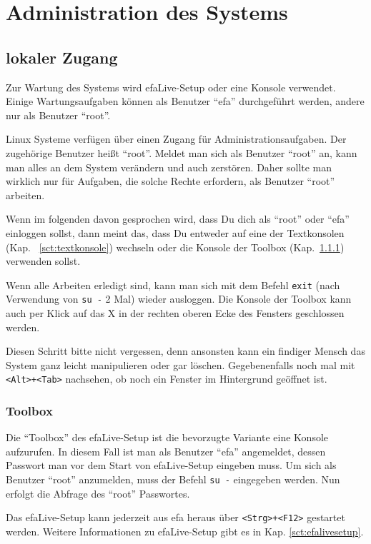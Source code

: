 \documentclass[a4paper,12pt,twoside]{article}
\begin{document}
\section{Administration des Systems}
\label{sct:administration}
\subsection{lokaler Zugang}
\label{sct:lokaler_zugang}
Zur Wartung des Systems wird efaLive-Setup
oder eine Konsole verwendet. Einige Wartungsaufgaben können als
Benutzer "`efa"' durchgeführt werden, andere
nur als Benutzer "`root"'.

Linux Systeme verfügen über einen Zugang für Administrationsaufgaben.
Der zugehörige Benutzer heißt "`root"'.
Meldet man sich als Benutzer "`root"' an,
kann man alles an dem System verändern und auch zerstören. Daher sollte
man wirklich nur für Aufgaben, die solche Rechte erfordern, als
Benutzer "`root"' arbeiten.

Wenn im folgenden davon gesprochen wird, dass Du dich als
"`root"' oder "`efa"' einloggen sollst, dann meint das,
dass Du entweder auf eine der Textkonsolen (Kap.
~\ref{sct:textkonsole}) wechseln oder die Konsole der
Toolbox (Kap.~\ref{sct:toolbox}) verwenden sollst.

Wenn alle Arbeiten erledigt sind, kann man sich mit dem Befehl
\texttt{exit} (nach Verwendung von
\texttt{su -} 2 Mal) wieder ausloggen. Die Konsole
der Toolbox kann auch per Klick auf das X in der rechten oberen Ecke
des Fensters geschlossen werden.

Diesen Schritt bitte nicht vergessen, denn ansonsten kann ein findiger
Mensch das System ganz leicht manipulieren oder gar löschen.
Gegebenenfalls noch mal mit
\texttt{{\textless}Alt{\textgreater}+{\textless}Tab{\textgreater}} nachsehen, ob
noch ein Fenster im Hintergrund geöffnet ist.


\subsubsection{Toolbox}
\label{sct:toolbox}
Die "`Toolbox"' des efaLive-Setup ist die
bevorzugte Variante eine Konsole aufzurufen. In diesem Fall ist man als
Benutzer "`efa"' angemeldet, dessen Passwort
man vor dem Start von efaLive-Setup eingeben muss. Um sich als Benutzer
"`root"' anzumelden, muss der Befehl
\texttt{su -} eingegeben werden. Nun erfolgt die
Abfrage des "`root"' Passwortes.

Das efaLive-Setup kann jederzeit aus efa heraus über
\texttt{{\textless}Strg{\textgreater}+{\textless}F12{\textgreater}} gestartet
werden. Weitere Informationen zu efaLive-Setup gibt es in Kap.
\ref{sct:efalivesetup}.
\end{document}
